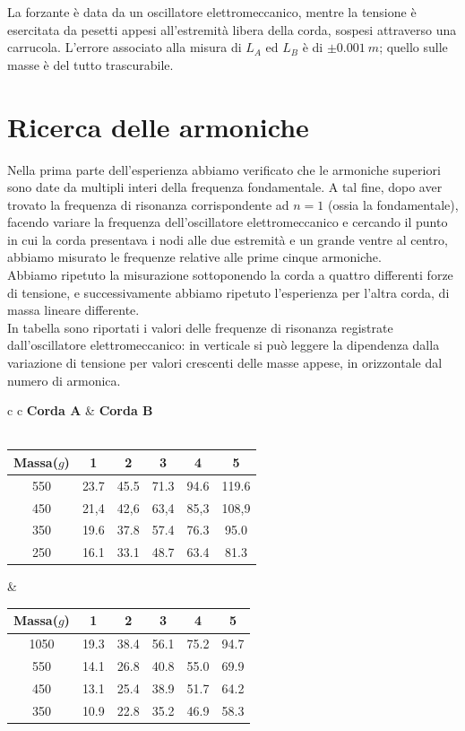 La forzante è data da un oscillatore elettromeccanico, mentre la tensione è esercitata da pesetti appesi all'estremità libera della corda, sospesi attraverso una carrucola. 
L'errore associato alla misura di $L_A$ ed $L_B$ è di $\pm0.001\ m$; quello sulle masse è del tutto trascurabile. 

\section{Ricerca delle armoniche}

Nella prima parte dell'esperienza abbiamo verificato che le armoniche superiori sono date da multipli interi della frequenza fondamentale. A tal fine, dopo aver trovato la frequenza di risonanza corrispondente ad $n=1$ (ossia la fondamentale), facendo variare la frequenza dell'oscillatore elettromeccanico e cercando il punto in cui la corda presentava i nodi alle due estremità e un grande ventre al centro, abbiamo misurato le frequenze relative alle prime cinque armoniche. 
\\

Abbiamo ripetuto la misurazione sottoponendo la corda a quattro differenti forze di tensione, e successivamente abbiamo ripetuto l'esperienza per l'altra corda, di massa lineare differente. \\
In tabella sono riportati i valori delle frequenze di risonanza registrate dall'oscillatore elettromeccanico: in verticale si può leggere la dipendenza dalla variazione di tensione per valori crescenti delle masse appese, in orizzontale dal numero di armonica.
\\

\begin{center}
\begin{tabular}{c     c}
\textbf{Corda A} & \textbf{Corda B}\\
\\
\begin{tabular}{ c | c | c | c | c | c }
Massa($g$) & 1 & 2 & 3 & 4 & 5\\
\midrule
550 & 23.7 & 45.5 & 71.3 & 94.6 & 119.6\\
450 & 21,4 & 42,6 & 63,4 & 85,3 & 108,9\\
350 & 19.6 & 37.8 & 57.4 & 76.3 & 95.0\\
250 & 16.1 & 33.1 & 48.7 & 63.4 & 81.3 \\
\end{tabular}
&
\hspace{1cm}

\begin{tabular}{ c | c | c | c | c | c }
Massa($g$) & 1 & 2 & 3 & 4 & 5\\
\midrule
1050 & 19.3 & 38.4 & 56.1 & 75.2 & 94.7 \\
550 & 14.1 & 26.8 & 40.8 & 55.0 & 69.9 \\
450 & 13.1 & 25.4 & 38.9 & 51.7 & 64.2\\
350 & 10.9 & 22.8 & 35.2 & 46.9 & 58.3\\
\end{tabular}

\end{tabular}
\end{center}


